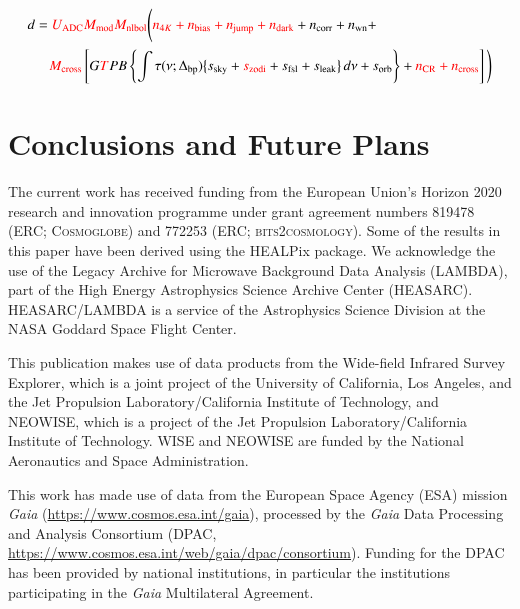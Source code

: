 \documentclass{aa}
\begin{document}
\begin{equation}
    \begin{aligned}
        d &= \textcolor{red}{U_{\text{ADC}} M_{\text{mod}} M_{\text{nlbol}}} \Bigg( \textcolor{red}{n_{4K} + n_{\text{bias}} + n_{\text{jump}} + n_{\text{dark}}} + n_{\text{corr}} + n_{\text{wn}} + \\
        &\quad \textcolor{red}{M_{\text{cross}}} \left[ G \textcolor{red}T P B \left\{ \int \tau(\nu; \Delta_{\text{bp}}) \big\{ s_{\text{sky}} + \textcolor{red}{s_{\text{zodi}}} + s_{\text{fsl}} + s_{\text{leak}} \big\} \, d\nu + s_{\text{orb}} \right\} + \textcolor{red}{n_{\text{CR}} + n_{\text{cross}}} \right] \Bigg)
    \end{aligned}
\end{equation}

\section{Conclusions and Future Plans}


\begin{acknowledgements}
 The current work has received funding from the European
  Union’s Horizon 2020 research and innovation programme under grant
  agreement numbers 819478 (ERC; \textsc{Cosmoglobe}) and 772253 (ERC;
  \textsc{bits2cosmology}). Some of the results in this paper have been derived using the HEALPix \citep{healpix} package.
  We acknowledge the use of the Legacy Archive for Microwave Background Data
  Analysis (LAMBDA), part of the High Energy Astrophysics Science Archive Center
  (HEASARC). HEASARC/LAMBDA is a service of the Astrophysics Science Division at
  the NASA Goddard Space Flight Center.  
  
   This publication makes use of data products from the Wide-field Infrared Survey Explorer, which is a joint project of the University of California, Los Angeles, and the Jet Propulsion Laboratory/California Institute of Technology, and NEOWISE, which is a project of the Jet Propulsion Laboratory/California Institute of Technology. WISE and NEOWISE are funded by the National Aeronautics and Space Administration.
   
   This work has made use of data from the European Space Agency (ESA) mission
{\it Gaia} (\url{https://www.cosmos.esa.int/gaia}), processed by the {\it Gaia}
Data Processing and Analysis Consortium (DPAC,
\url{https://www.cosmos.esa.int/web/gaia/dpac/consortium}). Funding for the DPAC
has been provided by national institutions, in particular the institutions
participating in the {\it Gaia} Multilateral Agreement.
\end{acknowledgements}


%



\end{document}
